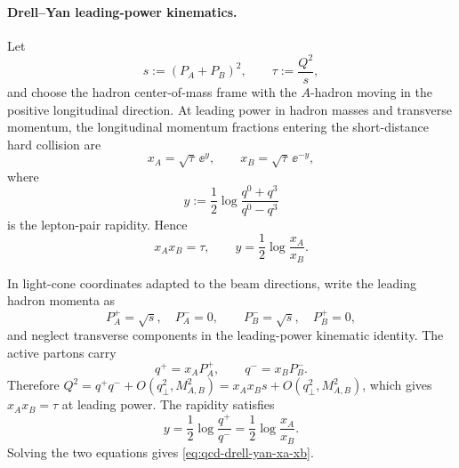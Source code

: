 \paragraph{Drell--Yan leading-power kinematics.}
Let
\[
  s:=(P_A+P_B)^2,
  \qquad
  \tau:=\frac{Q^2}{s},
\]
and choose the hadron center-of-mass frame with the \(A\)-hadron moving in the
positive longitudinal direction.  At leading power in hadron masses and
transverse momentum, the longitudinal momentum fractions entering the
short-distance hard collision are
\begin{equation}
  x_A=\sqrt{\tau}\,\ee^y,
  \qquad
  x_B=\sqrt{\tau}\,\ee^{-y},
  \label{eq:qcd-drell-yan-xa-xb}
\end{equation}
where
\[
  y:=\frac12\log\frac{q^0+q^3}{q^0-q^3}
\]
is the lepton-pair rapidity.  Hence
\[
  x_Ax_B=\tau,
  \qquad
  y=\frac12\log\frac{x_A}{x_B}.
\]

In light-cone coordinates adapted to the beam directions, write the leading
hadron momenta as
\[
  P_A^+=\sqrt{s},\quad P_A^-=0,
  \qquad
  P_B^-= \sqrt{s},\quad P_B^+=0,
\]
and neglect transverse components in the leading-power kinematic identity.
The active partons carry
\[
  q^+=x_AP_A^+,\qquad q^-=x_BP_B^-.
\]
Therefore \(Q^2=q^+q^-+O(q_\perp^2,M_{A,B}^2)=x_Ax_Bs+O(q_\perp^2,M_{A,B}^2)\),
which gives \(x_Ax_B=\tau\) at leading power.  The rapidity satisfies
\[
  y=\frac12\log\frac{q^+}{q^-}
  =
  \frac12\log\frac{x_A}{x_B}.
\]
Solving the two equations gives
\eqref{eq:qcd-drell-yan-xa-xb}.


